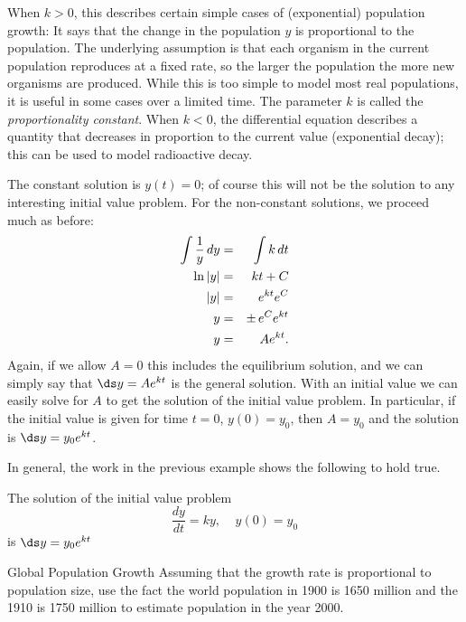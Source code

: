 \begin{solution}
When $k>0$, this describes certain simple cases of (exponential) population growth:
It says that the change in the population $y$ is proportional to the
population. The underlying assumption is that each organism in the
current population reproduces at a fixed rate, so the larger the
population the more new organisms are produced. While this is too
simple to model most real populations, it is useful in some cases over
a limited time.  The parameter $ k $ is called the \textit{proportionality constant}. 
When $k<0$, the differential equation describes a
quantity that decreases in proportion to the current value (exponential decay); this can
be used to model radioactive decay.

The constant solution is $y(t)=0$; of course this will not be the
solution to any interesting initial value problem. 
For the non-constant solutions, we proceed much as before:
\begin{eqnarray*}
\int {1\over y}\,dy&=&\int k\,dt\cr
\ln|y| &=& kt+C\cr
|y| &=& e^{kt} e^C\cr
y &=& \pm \,e^C e^{kt} \cr
y&=& Ae^{kt}.
\end{eqnarray*}
Again, if we allow $A=0$ this includes the equilibrium solution, and we
can simply say that $\ds y=Ae^{kt}$ is the general solution. With an
initial value we can easily solve for $A$ to get the solution of the
initial value problem. In particular, if the initial value is
given for time $t=0$, $y(0)=y_0$, then $A=y_0$ and the solution
is $\ds y= y_0 e^{kt}$.
\end{solution}

In general, the work in the previous example shows the following to hold true.

\begin{formulabox}[\label{expDE} ]
The solution of the initial value problem
\[
\frac{dy}{dt}=ky,\;\;\;\;y(0)=y_0
\]
is $ \ds y=y_0e^{kt} $
\end{formulabox}


\begin{example}{Global Population Growth}{}
Assuming that the growth rate is proportional to population size,
 use the fact the world population in 1900 is 1650 million and the 1910 is 1750
 million to estimate population in the year 2000.
\end{example}


